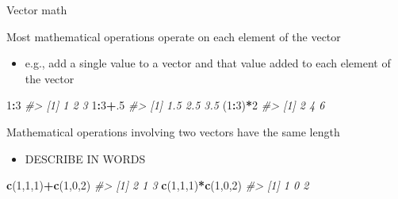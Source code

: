 \documentclass[10pt,ignorenonframetext,]{beamer}
\newenvironment{Shaded}{\begin{snugshade}}{\end{snugshade}}
\newcommand{\KeywordTok}[1]{\textcolor[rgb]{0.13,0.29,0.53}{\textbf{#1}}}
\newcommand{\DecValTok}[1]{\textcolor[rgb]{0.00,0.00,0.81}{#1}}
\newcommand{\CommentTok}[1]{\textcolor[rgb]{0.56,0.35,0.01}{\textit{#1}}}
\newcommand{\OperatorTok}[1]{\textcolor[rgb]{0.81,0.36,0.00}{\textbf{#1}}}
\newcommand{\NormalTok}[1]{#1}
\providecommand{\tightlist}{%
  \setlength{\itemsep}{0pt}\setlength{\parskip}{0pt}}
\begin{document}
\begin{frame}[fragile]{Vector math}

Most mathematical operations operate on each element of the vector

\begin{itemize}
\tightlist
\item
  e.g., add a single value to a vector and that value added to each
  element of the vector
\end{itemize}

\begin{Shaded}
\begin{Highlighting}[]
\DecValTok{1}\OperatorTok{:}\DecValTok{3}
\CommentTok{#> [1] 1 2 3}
\DecValTok{1}\OperatorTok{:}\DecValTok{3}\OperatorTok{+}\NormalTok{.}\DecValTok{5}
\CommentTok{#> [1] 1.5 2.5 3.5}
\NormalTok{(}\DecValTok{1}\OperatorTok{:}\DecValTok{3}\NormalTok{)}\OperatorTok{*}\DecValTok{2}
\CommentTok{#> [1] 2 4 6}
\end{Highlighting}
\end{Shaded}

Mathematical operations involving two vectors have the same length

\begin{itemize}
\tightlist
\item
  DESCRIBE IN WORDS
\end{itemize}

\begin{Shaded}
\begin{Highlighting}[]
\KeywordTok{c}\NormalTok{(}\DecValTok{1}\NormalTok{,}\DecValTok{1}\NormalTok{,}\DecValTok{1}\NormalTok{)}\OperatorTok{+}\KeywordTok{c}\NormalTok{(}\DecValTok{1}\NormalTok{,}\DecValTok{0}\NormalTok{,}\DecValTok{2}\NormalTok{)}
\CommentTok{#> [1] 2 1 3}
\KeywordTok{c}\NormalTok{(}\DecValTok{1}\NormalTok{,}\DecValTok{1}\NormalTok{,}\DecValTok{1}\NormalTok{)}\OperatorTok{*}\KeywordTok{c}\NormalTok{(}\DecValTok{1}\NormalTok{,}\DecValTok{0}\NormalTok{,}\DecValTok{2}\NormalTok{)}
\CommentTok{#> [1] 1 0 2}
\end{Highlighting}
\end{Shaded}

\end{frame}
\end{document}
